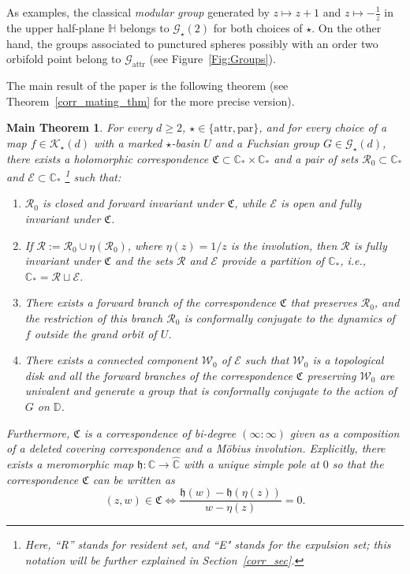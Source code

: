 \documentclass[11pt,a4paper, oneside]{amsart}
\newtheorem*{mainthm}{Main Theorem}
\theoremstyle{definition}
\theoremstyle{remark}
\numberwithin{equation}{section}
\def\cW{\mathcal {W}}
\def\cE{\mathcal {E}}
\def\cR{\mathcal {R}}
\renewcommand{\ge}{\geqslant}
\newcommand{\frakC}{\mathfrak{C}}
\newcommand{\Kstar}{{\mathscr K_\star}}
\newcommand{\Gstar}{\mathscr G_\star}
\newcommand{\parab}{{\text{par}}}
\newcommand{\attr}{{\text{attr}}}
\newcommand{\disk}{\mathbb{D}}
\newcommand{\C}{\mathbb{C}}
\newcommand{\Cc}{\widehat{{\C}}}
\begin{document}
As examples, the classical \emph{modular group} generated by $z \mapsto z+1$ and $z \mapsto -\frac{1}{z}$ in the upper half-plane $\mathbb H$ belongs to $\Gstar(2)$ for both choices of $\star$. On the other hand, the groups associated to punctured spheres possibly with an order two orbifold point belong to $\mathscr{G}_{\attr}$ (see Figure~\ref{Fig:Groups}).


The main result of the paper is the following theorem (see Theorem~\ref{corr_mating_thm} for the more precise version).

\begin{mainthm}\label{main_thm}
For every $d \ge 2$, $\star \in \{\attr, \parab\}$, and for every choice of a map $f \in \Kstar(d)$ with a marked $\star$-basin $U$ and a Fuchsian group $G \in \Gstar(d)$, there exists a holomorphic correspondence $\frakC \subset \C_* \times \C_*$ and a pair of sets $\pmb{\cR}_0 \subset \C_*$ and $\pmb{\cE} \subset \C_*$ \footnote{Here, ``R'' stands for \emph{r}esident set, and ``E" stands for the \emph{e}xpulsion set; this notation will be further explained in Section~\ref{corr_sec}.} such that:

\begin{enumerate}[leftmargin=8mm]
    \item 
    $\pmb{\cR}_0$ is closed and forward invariant under $\frakC$, while $\pmb{\cE}$ is open and fully invariant under $\frakC$.
    \item 
    If $\pmb{\cR} := \pmb{\cR}_0 \cup \eta(\pmb{\cR}_0)$, where $\eta(z) = 1/z$ is the involution, then $\pmb{\cR}$ is fully invariant under $\frakC$ and the sets $\pmb{\cR}$ and $\pmb{\cE}$ provide a partition of $\C_*$, i.e., $\C_*= \pmb{\cR} \sqcup \pmb{\cE}$.
    \item 
    There exists a forward branch of the correspondence $\frakC$ that preserves $\pmb{\cR}_0$, and the restriction of this branch $\pmb{\cR}_0$ is conformally conjugate to the dynamics of $f$ outside the grand orbit of $U$.
    \item 
    \label{Main:Item:4}
     There exists a connected component $\pmb{\cW}_0$ of $\pmb{\cE}$ such that $\pmb{\cW}_0$ is a topological disk and all the forward branches of the correspondence $\frakC$ preserving $\pmb{\cW}_0$ are univalent and generate a group that is conformally conjugate to the action of $G$ on $\disk$.
\end{enumerate}

Furthermore, $\frakC$ is a correspondence of bi-degree $(\infty:\infty)$ given as a composition of a deleted covering correspondence and a M{\"o}bius involution. Explicitly, there exists a meromorphic map $\mathfrak{h} \colon \C \to \Cc$ with a unique simple pole at $0$ so that the correspondence $\frakC$ can be written as 
\begin{equation}
(z, w) \in \mathfrak{C} \iff \frac{\mathfrak{h}(w)-\mathfrak{h}(\eta(z))}{w- \eta(z)}=0.
\label{corr_eqn}
\end{equation}
\end{mainthm}
\end{document}
